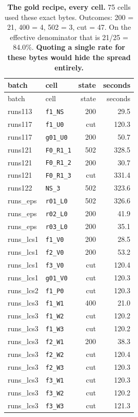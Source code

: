 \begin{longtable}{@{}llrr@{}}
\caption{\textbf{The gold recipe, every cell.} 75 cells used these exact bytes. Outcomes: 200 = 21, 400 = 4, 502 = 3, cut = 47. On the effective denominator that is 21/25 = 84.0\%. \textbf{Quoting a single rate for these bytes would hide the spread entirely.}\label{tab:appgoldhist}}\\
\toprule
batch & cell & state & seconds \\
\midrule
\endfirsthead
\toprule
batch & cell & state & seconds \\
\midrule
\endhead
\bottomrule
\endlastfoot
runs113 & \texttt{f1\_NS} & 200 & 29.5 \\
runs117 & \texttt{f1\_U0} & cut & 120.3 \\
runs117 & \texttt{g01\_U0} & 200 & 50.7 \\
runs121 & \texttt{F0\_R1\_1} & 502 & 328.5 \\
runs121 & \texttt{F0\_R1\_2} & 200 & 30.7 \\
runs121 & \texttt{F0\_R1\_3} & cut & 331.4 \\
runs122 & \texttt{NS\_3} & 502 & 323.6 \\
runs\_eps & \texttt{r01\_L0} & 502 & 326.6 \\
runs\_eps & \texttt{r02\_L0} & 200 & 41.9 \\
runs\_eps & \texttt{r03\_L0} & 200 & 35.1 \\
runs\_lcs1 & \texttt{f1\_V0} & 200 & 28.5 \\
runs\_lcs1 & \texttt{f2\_V0} & 200 & 53.2 \\
runs\_lcs1 & \texttt{f3\_V0} & cut & 120.4 \\
runs\_lcs1 & \texttt{g01\_V0} & cut & 120.3 \\
runs\_lcs2 & \texttt{f1\_P0} & cut & 120.3 \\
runs\_lcs3 & \texttt{f1\_W1} & 400 & 21.0 \\
runs\_lcs3 & \texttt{f1\_W2} & cut & 120.2 \\
runs\_lcs3 & \texttt{f1\_W3} & cut & 120.2 \\
runs\_lcs3 & \texttt{f2\_W1} & 200 & 38.3 \\
runs\_lcs3 & \texttt{f2\_W2} & cut & 120.4 \\
runs\_lcs3 & \texttt{f2\_W3} & cut & 120.3 \\
runs\_lcs3 & \texttt{f3\_W1} & cut & 120.3 \\
runs\_lcs3 & \texttt{f3\_W2} & cut & 120.2 \\
runs\_lcs3 & \texttt{f3\_W3} & cut & 121.3 \\

\end{longtable}

